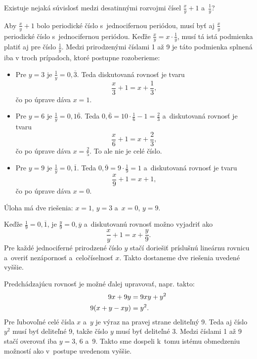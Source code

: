 {%
\napad
Existuje nejaká súvislosť medzi desatinnými rozvojmi čísel $\frac{x}{y}+1$ a~$\frac1y$?

\riesenie
Aby $\frac{x}{y}+1$ bolo periodické číslo s~jednocifernou periódou, musí byť aj $\frac{x}{y}$ periodické číslo s~jednocifernou periódou.
Keďže $\frac{x}{y}=x\cdot\frac1y$, musí tá istá podmienka platiť aj pre číslo $\frac1y$.
Medzi prirodzenými číslami 1 až 9 je táto podmienka splnená iba v troch prípadoch, ktoré postupne rozoberieme:
\begin{itemize}
\item Pre $y=3$ je $\frac1y=0{,}\overline{3}$.
Teda diskutovaná rovnosť je tvaru
$$
\frac{x}3+1=x+\frac13,
$$
čo po úprave dáva $x=1$.
\item Pre $y=6$ je $\frac1y=0{,}1\overline{6}$.
Teda $0{,}\overline{6}=10\cdot\frac16-1=\frac23$ a~diskutovaná rovnosť je tvaru
$$
\frac{x}6+1=x+\frac23,
$$
čo po úprave dáva $x=\frac25$.
To ale nie je celé číslo.
\item Pre $y=9$ je $\frac1y=0{,}\overline{1}$.
Teda $0{,}\overline{9}=9\cdot\frac19=1$ a~diskutovaná rovnosť je tvaru
$$
\frac{x}9+1=x+1,
$$
čo po úprave dáva $x=0$.
\end{itemize}
Úloha má dve riešenia: $x=1$, $y=3$ a~$x=0$, $y=9$.

\poznamky
Keďže $\frac19=0{,}\overline{1}$, je $\frac{y}9=0{,}\overline{y}$ a~diskutovanú rovnosť možno vyjadriť ako
$$
\frac{x}{y}+1=x+\frac{y}{9}.
$$
Pre každé jednociferné prirodzené číslo $y$ stačí doriešiť príslušnú lineárnu rovnicu a~overiť nezápornosť a~celočíselnosť $x$.
Takto dostaneme dve riešenia uvedené vyššie.

Predchádzajúcu rovnosť je možné ďalej upravovať, napr. takto:
$$\aligned
9x+9y&=9xy+y^2 \\
9(x+y-xy)&=y^2.
\endaligned
$$
Pre ľubovoľné celé čísla $x$ a~$y$ je výraz na pravej strane deliteľný 9.
Teda aj číslo $y^2$ musí byť deliteľné 9, takže číslo $y$ musí byť deliteľné 3.
Medzi číslami 1 až 9 stačí overovať iba $y=3$, 6 a~9.
Takto sme dospeli k~tomu istému obmedzeniu možností ako v~postupe uvedenom vyššie.
}

